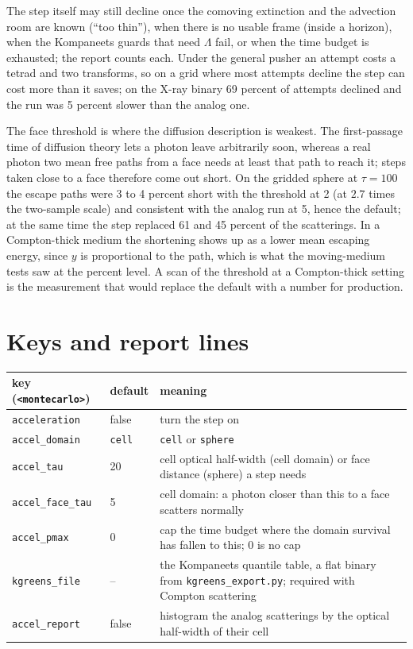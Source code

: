 \documentclass[11pt]{article}
\newcommand{\key}[1]{\texttt{#1}}
\begin{document}
The step itself may still decline once the comoving extinction and the advection room
are known (``too thin''), when there is no usable frame (inside a horizon), when the
Kompaneets guards that need $\Lambda$ fail, or when the time budget is exhausted; the
report counts each.  Under the general pusher an attempt costs a tetrad and two
transforms, so on a grid where most attempts decline the step can cost more than it
saves; on the X-ray binary 69 percent of attempts declined and the run was 5 percent
slower than the analog one.

The face threshold is where the diffusion description is weakest.  The first-passage
time of diffusion theory lets a photon leave arbitrarily soon, whereas a real photon two
mean free paths from a face needs at least that path to reach it; steps taken close to a
face therefore come out short.  On the gridded sphere at $\tau=100$ the escape paths
were 3 to 4 percent short with the threshold at 2 (at $2.7$ times the two-sample scale)
and consistent with the analog run at 5, hence the default; at the same time the step
replaced 61 and 45 percent of the scatterings.  In a Compton-thick medium the
shortening shows up as a lower mean escaping energy, since $y$ is proportional to the
path, which is what the moving-medium tests saw at the percent level.  A scan of the
threshold at a Compton-thick setting is the measurement that would replace the default
with a number for production.

\section{Keys and report lines}
\label{sec:keys}

\begin{center}
\begin{tabular}{llp{8.2cm}}
\toprule
key (\texttt{<montecarlo>}) & default & meaning \\
\midrule
\key{acceleration} & false & turn the step on \\
\key{accel\_domain} & \texttt{cell} & \texttt{cell} or \texttt{sphere} \\
\key{accel\_tau} & 20 & cell optical half-width (cell domain) or face distance (sphere) a step needs \\
\key{accel\_face\_tau} & 5 & cell domain: a photon closer than this to a face scatters normally \\
\key{accel\_pmax} & 0 & cap the time budget where the domain survival has fallen to this; 0 is no cap \\
\key{kgreens\_file} & -- & the Kompaneets quantile table, a flat binary from \texttt{kgreens\_export.py}; required with Compton scattering \\
\key{accel\_report} & false & histogram the analog scatterings by the optical half-width of their cell \\
\bottomrule
\end{tabular}
\end{center}
\end{document}
